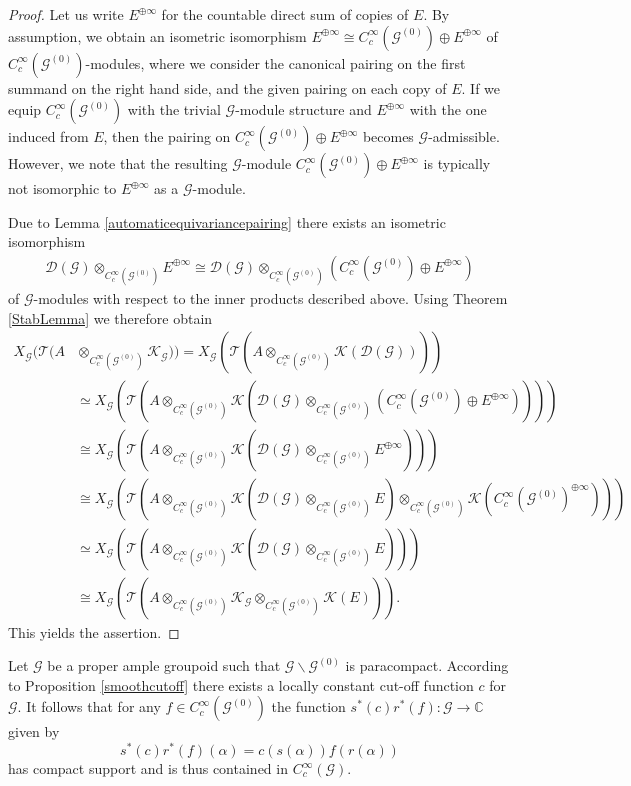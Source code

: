 \documentclass{amsart}
\newcommand{\G}{\mathcal{G}}
\newcommand{\K}{\mathcal{K}}
\newcommand{\T}{\mathcal{T}}
\newcommand{\DG}{\mathcal{D}(\mathcal{G})}
\newcommand{\KG}{\mathcal{K}_{\mathcal{G}}}
\newcommand{\ccinfty}{C_c^\infty}
\begin{document}
\begin{proof}
Let us write $ E^{\oplus \infty} $ for the countable direct sum of copies of $ E $. By assumption, we obtain an isometric isomorphism $ E^{\oplus \infty} \cong \ccinfty(\G^{(0)}) \oplus E^{\oplus \infty} $ of $ \ccinfty(\G^{(0)}) $-modules, where we consider the canonical pairing on the first summand on the right hand side, and the given pairing on each copy of $ E $. If we equip $ \ccinfty(\G^{(0)}) $ with the trivial $ \G $-module structure and $ E^{\oplus \infty} $ with the one induced from $ E $, then the pairing on $ \ccinfty(\G^{(0)}) \oplus E^{\oplus \infty} $ becomes $ \G $-admissible. However, we note that the resulting $ \G $-module $ \ccinfty(\G^{(0)}) \oplus E^{\oplus \infty} $ is typically not isomorphic to $ E^{\oplus \infty} $ as a $ \G $-module. 

Due to Lemma \ref{automaticequivariancepairing} there exists an isometric isomorphism 
\begin{align*}
\DG \otimes_{\ccinfty(\G^{(0)})} E^{\oplus \infty} \cong \DG \otimes_{\ccinfty(\G^{(0)})} (\ccinfty(\G^{(0)}) \oplus E^{\oplus\infty}) 
\end{align*}
of $ \G $-modules with respect to the inner products described above. Using Theorem \ref{StabLemma} we therefore obtain 
\begin{align*}
X_\G(\T(A &\otimes_{\ccinfty(\G^{(0)})} \K_\G)) = X_\G(\T(A \otimes_{\ccinfty(\G^{(0)})} \K(\DG))) \\ 
&\simeq X_\G(\T(A \otimes_{\ccinfty(\G^{(0)})} \K(\DG \otimes_{\ccinfty(\G^{(0)})} (\ccinfty(\G^{(0)}) \oplus E^{\oplus\infty})))) \\
&\cong X_\G(\T(A \otimes_{\ccinfty(\G^{(0)})} \K(\DG \otimes_{\ccinfty(\G^{(0)})} E^{\oplus\infty}))) \\
&\cong X_\G(\T(A \otimes_{\ccinfty(\G^{(0)})} \K(\DG \otimes_{\ccinfty(\G^{(0)})} E) \otimes_{\ccinfty(\G^{(0)})} \K(\ccinfty(\G^{(0)})^{\oplus\infty}))) \\
&\simeq X_\G(\T(A \otimes_{\ccinfty(\G^{(0)})} \K(\DG \otimes_{\ccinfty(\G^{(0)})} E))) \\
&\cong X_\G(\T(A \otimes_{\ccinfty(\G^{(0)})} \KG \otimes_{\ccinfty(\G^{(0)})} \K(E))). 
\end{align*}
This yields the assertion. 
\end{proof}

Let $ \G $ be a proper ample groupoid such that $ \G \backslash \G^{(0)} $ is paracompact. According to Proposition \ref{smoothcutoff} there exists a locally constant cut-off function $ c $ for $ \G $. It follows that for any $ f \in \ccinfty(\G^{(0)}) $ the function $ s^*(c) r^*(f): \G \rightarrow \mathbb{C} $ given by 
$$
s^*(c) r^*(f)(\alpha) = c(s(\alpha)) f(r(\alpha)) 
$$
has compact support and is thus contained in $ \ccinfty(\G) $. 
\end{document}
